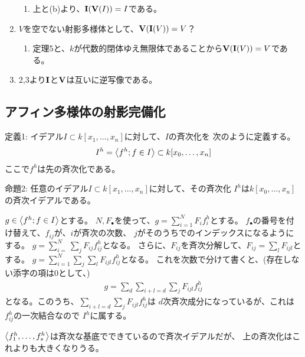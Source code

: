 \begin{myproof}
\begin{enumerate}
\begin{enumerate}
      \item 上と(b)より、$\textbf I(\textbf V(I)) = I$である。
    \end{enumerate}
    \item
    $V$を空でない射影多様体として、$\textbf V(\textbf I(V)) = V$？
    \begin{enumerate}
      \item 定理5と、$k$が代数的閉体ゆえ無限体であることから$\textbf V(\textbf I(V)) = V$である。
    \end{enumerate}
    \item
    2,3より$\textbf I$と$\textbf V$は互いに逆写像である。
  \end{enumerate}
\end{myproof}


\subsection{アフィン多様体の射影完備化}
\label{sub:アフィン多様体の射影完備化}
\begin{framed}
  定義1:
  イデアル$I\subset k[x_1,\dots,x_n]$に対して、$I$の斉次化を
  次のように定義する。
  \begin{align}
    I^h = \left\langle f^h; f\in I \right\rangle\subset k[x_0,\dots,x_n]
  \end{align}
  ここで$f^h$は先の斉次化である。
\end{framed}

\begin{framed}
  命題2:
  任意のイデアル$I\subset k[x_1,\dots,x_n]$に対して、その斉次化
  $I^h$は$k[x_0,\dots,x_n]$の斉次イデアルである。
\end{framed}
\begin{myproof}
  $g\in \left\langle f^h; f\in I \right\rangle$とする。
  $N,F_\bullet$を使って、$g=\sum_{i=1}^N F_i f_i^h$とする。
  $f_\bullet$の番号を付け替えて、$f_{ij}$が、$i$が斉次の次数、
  $j$がそのうちでのインデックスになるようにする。
  $g=\sum_{i=}^N \sum_j F_{ij} f_{ij}^h$となる。
  さらに、$F_{ij}$を斉次分解して、$F_{ij} = \sum_l F_{ijl}$とする。
  $g=\sum_{i=1}^N \sum_j \sum_l F_{ijl} f_{ij}^h$となる。
  これを次数で分けて書くと、(存在しない添字の項は0として、)
  \begin{align}
    g = \sum_{d}\sum_{i+l=d} \sum_j F_{ijl}f_{ij}^h
  \end{align}
  となる。このうち、$\sum_{i+l=d} \sum_j F_{ijl}f_{ij}^h$は
  $d$次斉次成分になっているが、これは$f_{ij}^h$の一次結合なので
  $I^h$に属する。
\end{myproof}

$\left\langle f_1^h,\dots,f_s^h \right\rangle$は斉次な基底でできているので斉次イデアルだが、
上の斉次化はこれよりも大きくなりうる。

